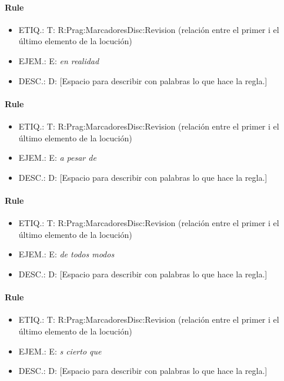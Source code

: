 \documentclass[11pt]{report}
\begin{document}
\paragraph*{Rule}
\begin{itemize}
\item ETIQ.:  T: R:Prag:MarcadoresDisc:Revision (relación entre el primer i el último elemento de la locución)
\item EJEM.:  E: \emph{en realidad}
\item DESC.:  D: [Espacio para describir con palabras lo que hace la regla.]
\end{itemize}

\paragraph*{Rule}
\begin{itemize}
\item ETIQ.:  T: R:Prag:MarcadoresDisc:Revision (relación entre el primer i el último elemento de la locución)
\item EJEM.:  E: \emph{a pesar de}
\item DESC.:  D: [Espacio para describir con palabras lo que hace la regla.]
\end{itemize}

\paragraph*{Rule}
\begin{itemize}
\item ETIQ.:  T: R:Prag:MarcadoresDisc:Revision (relación entre el primer i el último elemento de la locución)
\item EJEM.:  E: \emph{de todos modos}
\item DESC.:  D: [Espacio para describir con palabras lo que hace la regla.]
\end{itemize}

\paragraph*{Rule}
\begin{itemize}
\item ETIQ.:  T: R:Prag:MarcadoresDisc:Revision (relación entre el primer i el último elemento de la locución)
\item EJEM.:  E: \emph{s cierto que}
\item DESC.:  D: [Espacio para describir con palabras lo que hace la regla.]
\end{itemize}
\end{document}
